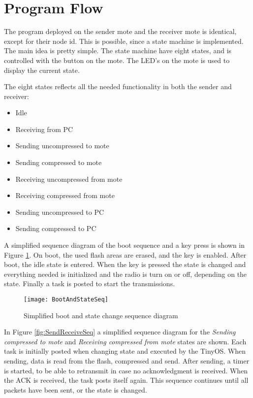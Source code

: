 \section{Program Flow}
\label{sec:program_flow}
The program deployed on the sender mote and the receiver mote is identical, except for their node id.
This is possible, since a state machine is implemented. The main idea is pretty simple. The state machine have eight states, and is controlled with the button on the mote. The LED's on the mote is used to display the current state.


The eight states reflects all the needed functionality in both the sender and receiver:
\begin{itemize}
\item Idle
\item Receiving from PC
\item Sending uncompressed to mote
\item Sending compressed to mote
\item Receiving uncompressed from mote
\item Receiving compressed from mote
\item Sending uncompressed to PC
\item Sending compressed to PC
\end{itemize}

A simplified sequence diagram of the boot sequence and a key press is shown in Figure \ref{fig:BootAndState}. On boot, the used flash areas are erased, and the key is enabled. After boot, the idle state is entered. When the key is pressed the state is changed and everything needed is initialized and the radio is turn on or off, depending on the state. Finally a task is posted to start the transmissions.

\begin{figure}[H]
\centering
\texttt{[image: BootAndStateSeq]}
\caption{Simplified boot and state change sequence diagram}
\label{fig:BootAndState}
\end{figure}

In Figure \ref{fig:SendReceiveSeq} a simplified sequence diagram for the \emph{Sending compressed to mote} and \emph{Receiving compressed from mote} states are shown. Each task is initially posted when changing state and executed by the TinyOS. When sending, data is read from the flash, compressed and send. After sending, a timer is started, to be able to retransmit in case no acknowledgment is received. When the ACK is received, the task posts itself again. This sequence continues until all packets have been sent, or the state is changed.

